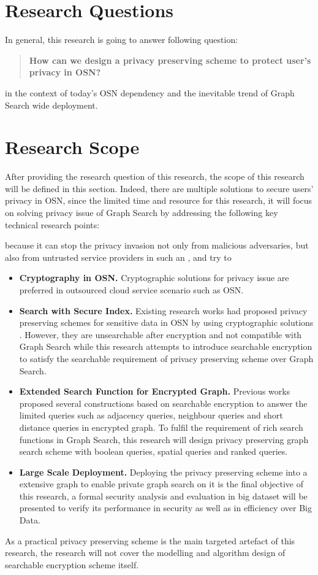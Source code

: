 \section{Research Questions}
In general, this research is going to answer following question:
\begin{quotation}
{ \bf How can we design a privacy preserving scheme to protect user's privacy in OSN?}
\end{quotation}
in the context of today's OSN dependency and the inevitable trend of Graph Search wide deployment.

\section{Research Scope}
After providing the research question of this research, the scope of this research will be defined in this section. Indeed, there are multiple solutions to secure users' privacy in OSN, since the limited time and resource for this research, it will focus on solving privacy issue of Graph Search by addressing the following key technical research points:

 because it can stop the privacy invasion not only from malicious adversaries, but also from untrusted service providers in such an , and try to 

\begin{itemize}
\item{\bf Cryptography in OSN.} Cryptographic solutions for privacy issue are preferred in outsourced cloud service scenario such as OSN. 
\item{\bf Search with Secure Index.} Existing research works had proposed privacy preserving schemes for sensitive data in OSN by using cryptographic solutions \cite{baden2009persona, guha2008noyb, tootoonchian2009lockr, sun2010privacy, backes2011security, feldman2012social, jahid2011easier, nilizadeh2012cachet}. However, they are unsearchable after encryption and not compatible with Graph Search while this research attempts to introduce searchable encryption to satisfy the searchable requirement of privacy preserving scheme over Graph Search.
\item{\bf Extended Search Function for Encrypted Graph.} Previous works proposed several constructions based on searchable encryption to answer the limited queries such as adjacency queries, neighbour queries \cite{chase2010structured} and short distance queries \cite{meng2015grecs} in encrypted graph. To fulfil the requirement of rich search functions in Graph Search, this research will design privacy preserving graph search scheme with boolean queries, spatial queries and ranked queries.
\item {\bf Large Scale Deployment.} Deploying the privacy preserving scheme into a extensive graph to enable private graph search on it is the final objective of this research, a formal security analysis and evaluation in big dataset will be presented to verify its performance in security as well as in efficiency over Big Data. 
\end{itemize}

As a practical privacy preserving scheme is the main targeted artefact of this research, the research will not cover the modelling and algorithm design of searchable encryption scheme itself.














